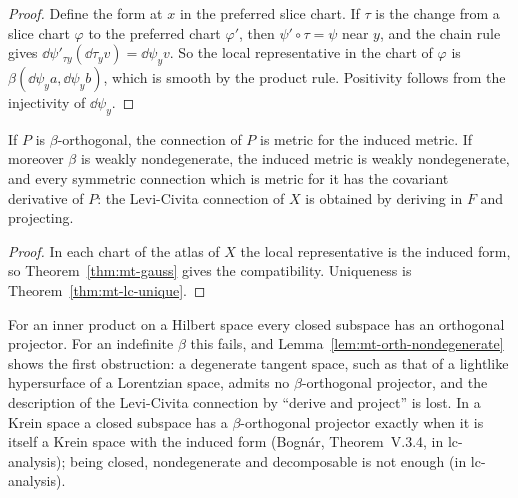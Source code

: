 \begin{proof}
  \leanok
  Define the form at $x$ in the preferred slice chart. If $\tau$ is the change from a slice chart
  $\varphi$ to the preferred chart $\varphi'$, then $\psi' \circ \tau = \psi$ near $y$, and the
  chain rule gives $\dd\psi'_{\tau y}(\dd\tau_y v) = \dd\psi_y v$. So the local representative
  in the chart of $\varphi$ is $\beta(\dd\psi_y a, \dd\psi_y b)$, which is smooth by the product
  rule. Positivity follows from the injectivity of $\dd\psi_y$.
\end{proof}

\begin{theorem}
  \label{thm:mt-submanifold-levi-civita}
  \leanok
  If $P$ is $\beta$-orthogonal, the connection of $P$ is metric for the induced metric. If
  moreover $\beta$ is weakly nondegenerate, the induced metric is weakly nondegenerate, and every
  symmetric connection which is metric for it has the covariant derivative of $P$: the
  Levi-Civita connection of $X$ is obtained by deriving in $F$ and projecting.
\end{theorem}

\begin{proof}
  \leanok
  In each chart of the atlas of $X$ the local representative is the induced form, so
  Theorem~\ref{thm:mt-gauss} gives the compatibility. Uniqueness is
  Theorem~\ref{thm:mt-lc-unique}.
\end{proof}

\begin{remark}
  For an inner product on a Hilbert space every closed subspace has an orthogonal projector. For
  an indefinite $\beta$ this fails, and Lemma~\ref{lem:mt-orth-nondegenerate} shows the first
  obstruction: a degenerate tangent space, such as that of a lightlike hypersurface of a
  Lorentzian space, admits no $\beta$-orthogonal projector, and the description of the
  Levi-Civita connection by ``derive and project'' is lost. In a Krein space a closed subspace
  has a $\beta$-orthogonal projector exactly when it is itself a Krein space with the induced form
  (Bognár, Theorem~V.3.4, in lc-analysis); being closed, nondegenerate and decomposable is not
  enough \cite[Example~V.3.3]{Bog74} (in lc-analysis).
\end{remark}

